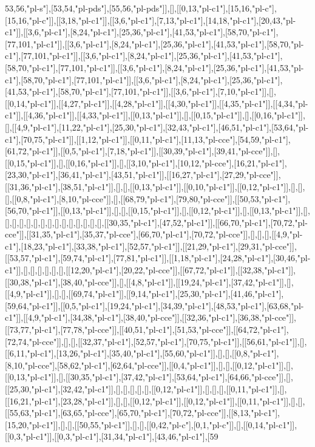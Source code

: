 53,56,"pl-s"],[53,54,"pl-pds"],[55,56,"pl-pds"]],[],[[0,13,"pl-c1"],[15,16,"pl-c"],[15,16,"pl-c"]],[[3,18,"pl-c1"]],[[3,6,"pl-c1"],[7,13,"pl-c1"],[14,18,"pl-c1"],[20,43,"pl-c1"]],[[3,6,"pl-c1"],[8,24,"pl-c1"],[25,36,"pl-c1"],[41,53,"pl-c1"],[58,70,"pl-c1"],[77,101,"pl-c1"]],[[3,6,"pl-c1"],[8,24,"pl-c1"],[25,36,"pl-c1"],[41,53,"pl-c1"],[58,70,"pl-c1"],[77,101,"pl-c1"]],[[3,6,"pl-c1"],[8,24,"pl-c1"],[25,36,"pl-c1"],[41,53,"pl-c1"],[58,70,"pl-c1"],[77,101,"pl-c1"]],[[3,6,"pl-c1"],[8,24,"pl-c1"],[25,36,"pl-c1"],[41,53,"pl-c1"],[58,70,"pl-c1"],[77,101,"pl-c1"]],[[3,6,"pl-c1"],[8,24,"pl-c1"],[25,36,"pl-c1"],[41,53,"pl-c1"],[58,70,"pl-c1"],[77,101,"pl-c1"]],[[3,6,"pl-c1"],[7,10,"pl-c1"]],[],[[0,14,"pl-c1"]],[[4,27,"pl-c1"]],[[4,28,"pl-c1"]],[[4,30,"pl-c1"]],[[4,35,"pl-c1"]],[[4,34,"pl-c1"]],[[4,36,"pl-c1"]],[[4,33,"pl-c1"]],[[0,13,"pl-c1"]],[],[[0,15,"pl-c1"]],[],[[0,16,"pl-c1"]],[],[[4,9,"pl-c1"],[11,22,"pl-c1"],[25,30,"pl-c1"],[32,43,"pl-c1"],[46,51,"pl-c1"],[53,64,"pl-c1"],[70,75,"pl-c1"]],[[1,12,"pl-c1"]],[[0,11,"pl-c1"],[11,13,"pl-cce"],[54,59,"pl-c1"],[61,72,"pl-c1"]],[[0,5,"pl-c1"],[7,18,"pl-c1"]],[[30,39,"pl-c1"],[39,41,"pl-cce"]],[],[[0,15,"pl-c1"]],[],[[0,16,"pl-c1"]],[],[[3,10,"pl-c1"],[10,12,"pl-cce"],[16,21,"pl-c1"],[23,30,"pl-c1"],[36,41,"pl-c1"],[43,51,"pl-c1"]],[[16,27,"pl-c1"],[27,29,"pl-cce"]],[[31,36,"pl-c1"],[38,51,"pl-c1"]],[],[],[[0,13,"pl-c1"]],[[0,10,"pl-c1"]],[[0,12,"pl-c1"]],[],[],[],[[0,8,"pl-c1"],[8,10,"pl-cce"]],[],[[68,79,"pl-c1"],[79,80,"pl-cce"]],[[50,53,"pl-c1"],[56,70,"pl-c1"]],[[0,13,"pl-c1"]],[],[],[[0,15,"pl-c1"]],[],[[0,12,"pl-c1"]],[],[[0,13,"pl-c1"]],[],[],[],[],[],[],[],[],[],[],[],[],[],[],[],[[30,35,"pl-c1"],[47,52,"pl-c1"]],[[66,70,"pl-c1"],[70,72,"pl-cce"]],[[31,35,"pl-c1"],[35,37,"pl-cce"],[66,70,"pl-c1"],[70,72,"pl-cce"]],[],[],[],[[4,9,"pl-c1"],[18,23,"pl-c1"],[33,38,"pl-c1"],[52,57,"pl-c1"]],[[21,29,"pl-c1"],[29,31,"pl-cce"]],[[53,57,"pl-c1"],[59,74,"pl-c1"],[77,81,"pl-c1"]],[[1,18,"pl-c1"],[24,28,"pl-c1"],[30,46,"pl-c1"]],[],[],[],[],[],[],[[12,20,"pl-c1"],[20,22,"pl-cce"]],[[67,72,"pl-c1"]],[[32,38,"pl-c1"]],[[30,38,"pl-c1"],[38,40,"pl-cce"]],[],[[4,8,"pl-c1"]],[[19,24,"pl-c1"],[37,42,"pl-c1"]],[],[[4,9,"pl-c1"]],[],[],[[69,74,"pl-c1"]],[[9,14,"pl-c1"],[25,30,"pl-c1"],[41,46,"pl-c1"],[59,64,"pl-c1"]],[[0,5,"pl-c1"],[19,24,"pl-c1"],[34,39,"pl-c1"],[48,53,"pl-c1"],[63,68,"pl-c1"]],[[4,9,"pl-c1"],[34,38,"pl-c1"],[38,40,"pl-cce"]],[[32,36,"pl-c1"],[36,38,"pl-cce"]],[[73,77,"pl-c1"],[77,78,"pl-cce"]],[[40,51,"pl-c1"],[51,53,"pl-cce"]],[[64,72,"pl-c1"],[72,74,"pl-cce"]],[],[],[[32,37,"pl-c1"],[52,57,"pl-c1"],[70,75,"pl-c1"]],[[56,61,"pl-c1"]],[],[[6,11,"pl-c1"],[13,26,"pl-c1"],[35,40,"pl-c1"],[55,60,"pl-c1"]],[],[],[[0,8,"pl-c1"],[8,10,"pl-cce"],[58,62,"pl-c1"],[62,64,"pl-cce"]],[[0,4,"pl-c1"]],[],[],[[0,12,"pl-c1"]],[],[[0,13,"pl-c1"]],[],[[30,35,"pl-c1"],[37,42,"pl-c1"],[53,64,"pl-c1"],[64,66,"pl-cce"]],[],[[25,30,"pl-c1"],[32,42,"pl-c1"]],[],[],[],[],[],[[0,12,"pl-c1"]],[],[],[],[[0,11,"pl-c1"]],[],[[16,21,"pl-c1"],[23,28,"pl-c1"]],[],[],[[0,12,"pl-c1"]],[[0,12,"pl-c1"]],[[0,11,"pl-c1"]],[],[],[[55,63,"pl-c1"],[63,65,"pl-cce"],[65,70,"pl-c1"],[70,72,"pl-cce"]],[[8,13,"pl-c1"],[15,20,"pl-c1"]],[],[],[[50,55,"pl-c1"]],[],[],[[0,42,"pl-c"],[0,1,"pl-c"]],[],[[0,14,"pl-c1"]],[[0,3,"pl-c1"]],[[0,3,"pl-c1"],[31,34,"pl-c1"],[43,46,"pl-c1"],[59